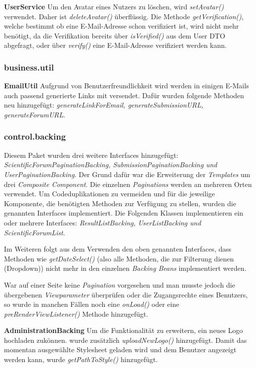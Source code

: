 \textbf{UserService} Um den Avatar eines Nutzers zu löschen, wird \emph{setAvatar()} verwendet. Daher ist \emph{deleteAvatar()} überflüssig. \newline
Die Methode \emph{getVerification()}, welche bestimmt ob eine E-Mail-Adresse schon verifiziert ist, wird nicht mehr benötigt, da die Verifikation bereits über \emph{isVerified()} aus dem User DTO abgefragt, oder über \emph{verify()} eine E-Mail-Adresse verifiziert werden kann.

\subsubsection{business.util}

\textbf{EmailUtil} Aufgrund von Benutzerfreundlichkeit wird
werden in einigen E-Mails auch passend generierte Links mit versendet. Dafür wurden folgende Methoden neu hinzugefügt: \emph{generateLinkForEmail, generateSubmissionURL, generateForumURL}.

\subsubsection{control.backing}

Diesem Paket wurden drei weitere Interfaces hinzugefügt: \emph{ScientificForumPaginationBacking, SubmissionPaginationBacking und UserPaginationBacking}. Der Grund dafür war die Erweiterung der \emph{Templates} um drei \emph{Composite Component}. Die einzelnen \emph{Paginations} werden an mehreren Orten verwendet. Um Codeduplikationen zu vermeiden und für die jeweilige Komponente, die benötigten Methoden zur Verfügung zu stellen, wurden die genannten Interfaces implementiert. Die Folgenden Klassen implementieren ein oder mehrere Interfaces: \emph{ResultListBacking, UserListBacking und ScientificForumList}.

Im Weiteren folgt aus dem Verwenden den oben genannten Interfaces, dass Methoden wie \emph{getDateSelect()} (also alle Methoden, die zur Filterung dienen (Dropdown)) nicht mehr in den einzelnen \emph{Backing Beans} implementiert werden.

War auf einer Seite keine \emph{Pagination} vorgesehen und man musste jedoch die übergebenen \emph{Viewparameter} überprüfen oder die Zugangsrechte eines Benutzers, so wurde in manchen Fällen noch eine \emph{onLoad()} oder eine \emph{preRenderViewListener()} Methode hinzugefügt.

\textbf{AdministrationBacking} Um die Funktionalität zu erweitern, ein neues Logo hochladen zukönnen. wurde zusätzlich \emph{uploadNewLogo()} hinzugefügt. \newline
Damit das momentan ausgewählte Stylesheet geladen wird und dem Benutzer angezeigt werden kann, wurde \emph{getPathToStyle()} hinzugefügt.

